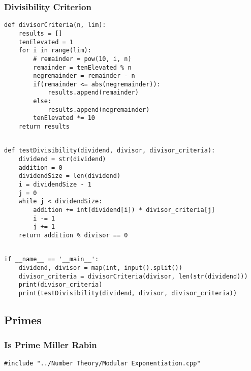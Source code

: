 \documentclass[twoside]{article}
\begin{document}
\begin{multicols*}{2}
\subsubsection*{Divisibility Criterion}
\begin{verbatim}
def divisorCriteria(n, lim):
    results = []
    tenElevated = 1
    for i in range(lim):
        # remainder = pow(10, i, n)
        remainder = tenElevated % n
        negremainder = remainder - n
        if(remainder <= abs(negremainder)):
            results.append(remainder)
        else:
            results.append(negremainder)
        tenElevated *= 10
    return results


\end{verbatim}
\vspace{-12pt}
\begin{verbatim}
def testDivisibility(dividend, divisor, divisor_criteria):
    dividend = str(dividend)
    addition = 0
    dividendSize = len(dividend)
    i = dividendSize - 1
    j = 0
    while j < dividendSize:
        addition += int(dividend[i]) * divisor_criteria[j]
        i -= 1
        j += 1
    return addition % divisor == 0


\end{verbatim}
\vspace{-12pt}
\begin{verbatim}
if __name__ == '__main__':
    dividend, divisor = map(int, input().split())
    divisor_criteria = divisorCriteria(divisor, len(str(dividend)))
    print(divisor_criteria)
    print(testDivisibility(dividend, divisor, divisor_criteria))

\end{verbatim}

\subsectionfont{\bfseries\sffamily\centering\LARGE}
\vspace{0em}
\subsection*{Primes}
\vspace{2em}
\subsubsectionfont{\large\bfseries\sffamily\underline}
\subsubsection*{Is Prime Miller Rabin}
\begin{verbatim}
#include "../Number Theory/Modular Exponentiation.cpp"


\end{verbatim}
\end{multicols*}
\end{document}
